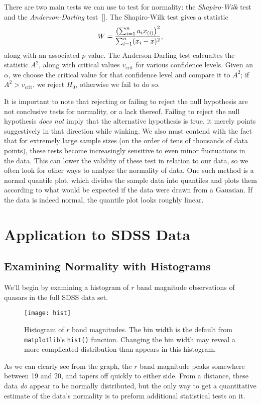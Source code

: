 There are two main tests we can use to test for normality: the \emph{Shapiro-Wilk} test and the \emph{Anderson-Darling} test~[\cite{nist}]. The Shapiro-Wilk test gives a statistic \[ W = \frac{\qty(\sum_{i=1}^n a_ix_{(i)})^2}{\sum_{i=1}^n (x_i - \bar{x})^2}, \]
along with an associated $p$-value. The Anderson-Darling test calcualtes the statistic $A^2$, along with critical values $v_\text{crit}$ for various confidence levels. Given an $\alpha$, we choose the critical value for that confidence level and compare it to $A^2$; if $A^2 > v_\text{crit}$, we reject $H_0$, otherwise we fail to do so.

It is important to note that rejecting or failing to reject the null hypothesis are not conclusive tests for normality, or a lack thereof. Failing to reject the null hypothesis \emph{does not} imply that the alternative hypothesis is true, it merely points suggestively in that direction while winking. We also must contend with the fact that for extremely large sample sizes (on the order of tens of thousands of data points), these tests become increasingly sensitive to even minor fluctuations in the data. This can lower the validity of these test in relation to our data, so we often look for other ways to analyze the normality of data. One such method is a normal quantile plot, which divides the sample data into quantiles and plots them according to what would be expected if the data were drawn from a Gaussian. If the data is indeed normal, the quantile plot looks roughly linear.

\section{Application to SDSS Data}
\subsection*{Examining Normality with Histograms}
We'll begin by examining a histogram of $r$ band magnitude observations of quasars in the full SDSS data set.
\begin{figure}
	\texttt{[image: hist]}
	\caption{Histogram of $r$ band magnitudes. The bin width is the default from \texttt{matplotlib}'s \texttt{hist()} function. Changing the bin width may reveal a more complicated distribution than appears in this histogram.}
\end{figure}
As we can clearly see from the graph, the $r$ band magnitude peaks somewhere between 19 and 20, and tapers off quickly to either side. From a distance, these data \emph{do} appear to be normally distributed, but the only way to get a quantitative estimate of the data's normality is to preform additional statistical tests on it. 

